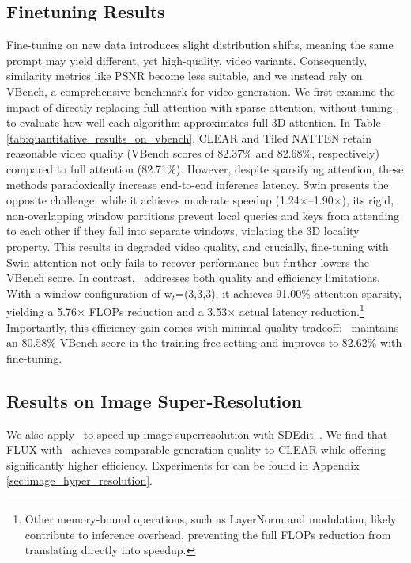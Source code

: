 \subsection{Finetuning Results}
\label{sec:finetuning_results}

Fine-tuning on new data introduces slight distribution shifts, meaning the same prompt may yield different, yet high-quality, video variants. Consequently, similarity metrics like PSNR become less suitable, and we instead rely on VBench\citep{huang2024vbench}, a comprehensive benchmark for video generation. We first examine the impact of directly replacing full attention with sparse attention, without tuning, to evaluate how well each algorithm approximates full 3D attention. In Table \ref{tab:quantitative_results_on_vbench}, CLEAR and Tiled NATTEN retain reasonable video quality (VBench scores of 82.37\% and 82.68\%, respectively) compared to full attention (82.71\%). However, despite sparsifying attention, these methods paradoxically increase end-to-end inference latency. Swin presents the opposite challenge: while it achieves moderate speedup (1.24$\times$–1.90$\times$), its rigid, non-overlapping window partitions prevent local queries and keys from attending to each other if they fall into separate windows, violating the 3D locality property. This results in degraded video quality, and crucially, fine-tuning with Swin attention not only fails to recover performance but further lowers the VBench score.
In contrast, \methodnameshort~addresses both quality and efficiency limitations. With a window configuration of w$_t$=(3,3,3), it achieves 91.00\% attention sparsity, yielding a 5.76$\times$ FLOPs reduction and a 3.53$\times$ actual latency reduction.\footnote{Other memory-bound operations, such as LayerNorm and modulation, likely contribute to inference overhead, preventing the full FLOPs reduction from translating directly into speedup.} Importantly, this efficiency gain comes with minimal quality tradeoff: \methodnameshort~maintains an 80.58\% VBench score in the training-free setting and improves to 82.62\% with fine-tuning.

\subsection{Results on Image Super-Resolution}
We also apply \methodnameshort~to speed up image superresolution with SDEdit~\citep{meng2022sdeditguidedimagesynthesis}. We find that FLUX with \methodnameshort~achieves comparable generation quality to CLEAR while offering significantly higher efficiency. Experiments for can be found in Appendix \ref{sec:image_hyper_resolution}.
